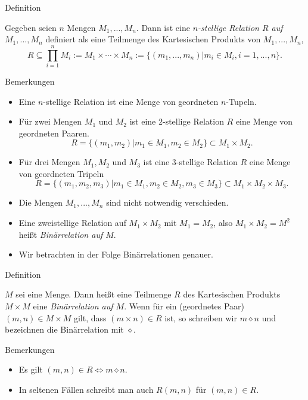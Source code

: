\documentclass[
  8pt,
  ignorenonframetext,
]{beamer}
\providecommand{\tightlist}{%
  \setlength{\itemsep}{0pt}\setlength{\parskip}{0pt}}
\begin{document}
\begin{frame}{Definition}
\protect\hypertarget{definition-2}{}
\footnotesize
\begin{definition}
\justifying
Gegeben seien $n$ Mengen $M_1,...,M_n$. Dann ist eine \textit{$n$-stellige Relation $R$ auf $M_1,...,M_n$}
definiert als eine Teilmenge des Kartesischen Produkts von $M_1,...,M_n$,
\begin{equation}
R \subseteq \prod_{i=1}^n M_i := M_1 \times \cdots \times M_n := \{(m_1,...,m_n)|m_i \in M_i, i = 1,...,n\}.
\end{equation}
\end{definition}

Bemerkungen

\begin{itemize}
\tightlist
\item
  Eine \(n\)-stellige Relation ist eine Menge von geordneten
  \(n\)-Tupeln.
\item
  Für zwei Mengen \(M_1\) und \(M_2\) ist eine \(2\)-stellige Relation
  \(R\) eine Menge von geordneten Paaren. \begin{equation}
  R = \{(m_1,m_2)|m_1 \in M_1,m_2 \in M_2\} \subset M_1 \times M_2.
  \end{equation}
\item
  Für drei Mengen \(M_1, M_2\) und \(M_3\) ist eine \(3\)-stellige
  Relation \(R\) eine Menge von geordneten Tripeln \begin{equation}
  R = \{(m_1,m_2,m_3)|m_1 \in M_1, m_2 \in M_2, m_3 \in M_3\} \subset M_1 \times M_2 \times M_3.
  \end{equation}
\item
  Die Mengen \(M_1,...,M_n\) sind nicht notwendig verschieden.
\item
  Eine zweistellige Relation auf \(M_1 \times M_2\) mit \(M_1 = M_2\),
  also \(M_1 \times M_2 = M^2\) heißt \textit{Binärrelation auf $M$}.
\item
  Wir betrachten in der Folge Binärrelationen genauer.
\end{itemize}
\end{frame}

\begin{frame}{Definition}
\protect\hypertarget{definition-3}{}
\small
\begin{definition}[Binärrelation]
\justifying
$M$ sei eine Menge. Dann heißt eine Teilmenge $R$ des Kartesischen Produkts $M \times M$
eine \textit{Binärrelation auf $M$}. Wenn für ein (geordnetes Paar) $(m,n) \in M \times M$
gilt, dass $(m \times n) \in R$ ist, so schreiben wir $m\diamond n$ und bezeichnen
die Binärrelation mit $\diamond$.
\end{definition}

Bemerkungen

\begin{itemize}
\tightlist
\item
  Es gilt \((m,n) \in R \Leftrightarrow m \diamond n\).
\item
  In seltenen Fällen schreibt man auch \(R(m,n)\) für \((m,n)\in R\).
\end{itemize}
\end{frame}
\end{document}
